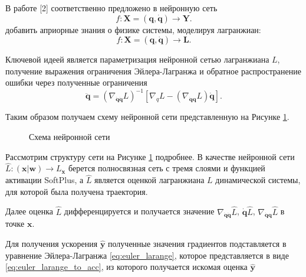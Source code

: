 \documentclass[a4paper, 12pt]{article}
\begin{document}
В работе [2] соответственно предложено в нейронную сеть 
\begin{equation}
f: \mathbf{X} = (\mathbf{q}, \mathbf{\dot{q}}) \rightarrow \mathbf{Y}.
\end{equation}
 добавить априорные знания о физике системы, моделируя лагранжиан:
\begin{equation}
f: \mathbf{X} = (\mathbf{q}, \mathbf{\dot{q}}) \rightarrow \mathbf{L}.
\end{equation}

Ключевой идеей является параметризация нейронной сетью лагранжиана $L$, получение выражения ограничения Эйлера-Лагранжа и обратное распространение ошибки через полученные ограничения
\begin{equation}
\ddot{\mathbf{q}} =\left(\nabla_{\dot{\mathbf{q}} \dot{\mathbf{q}}} L\right)^{-1}\left[\nabla_{q} L-\left(\nabla_{\dot{\mathbf{q}}\mathbf{q}} L\right) \dot{\mathbf{q}}\right].
\label{eq:euler_larange_to_acc}
\end{equation}

Таким образом получаем схему нейронной сети представленную на Рисунке \ref{fig: LNN}. 

\begin{figure}[!htbp]
\centerline{
}
\caption{Схема нейронной сети}
\label{fig: LNN}
\end{figure}

Рассмотрим структуру сети на Рисунке \ref{fig: LNN} подробнее.
В качестве нейронной сети $\hat{L} \colon (\mathbf{x} | \mathbf{w}) \to L_\mathbf{x}$ берется полносвязная сеть с тремя слоями и функцией активации SoftPlus, а $\hat{L}$ является оценкой лагранжиана $L$ динамической системы, для которой была получена траектория. 

Далее оценка $\hat{L}$ дифференцируется и получается значение $\nabla_{\dot{\mathbf{q}} \dot{\mathbf{q}}} \hat{L}$, $\dot{\mathbf{q}} \hat{L}$, $\nabla_{\dot{\mathbf{q}}\mathbf{q}} \hat{L}$ в точке $\mathbf{x}$.

Для получения ускорения $\hat{\mathbf{y}}$ полученные значения градиентов подставляется в уравнение Эйлера-Лагранжа \eqref{eq:euler_larange}, которое представляется в виде \eqref{eq:euler_larange_to_acc}, из которого получается искомая оценка $\hat{\mathbf{y}}$
\end{document}
